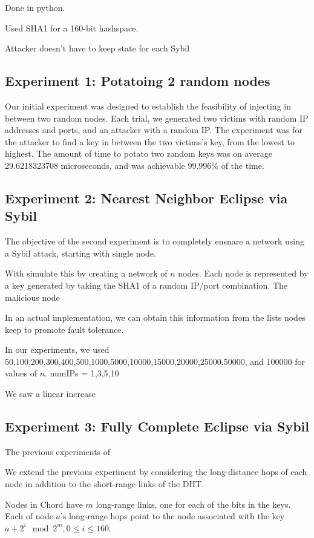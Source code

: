 \documentclass[10pt,a4paper]{article}
\begin{document}
Done in python.

Used SHA1 for a 160-bit hashspace.

Attacker doesn't have to keep state for each Sybil

\subsection{Experiment 1: Potatoing 2 random nodes}
Our initial experiment was designed to establish the feasibility of injecting in between two random nodes.
Each trial, we generated two victims with random IP addresses and ports, and an attacker with a random IP.
The experiment was for the attacker to find a key in between the two victims's key, from the lowest to highest.
The amount of time to potato two random keys was on average 29.6218323708 microseconds, and was achievable $ 99.996\%$ of the time.



\subsection{Experiment 2:  Nearest Neighbor Eclipse via Sybil}
The objective of the second experiment is to completely ensnare a network using a Sybil attack, starting with single node.

With simulate this by creating a network of $n$ nodes.  
Each node is represented by a key generated by taking the SHA1 of a random IP/port combination.
The malicious node 

In an actual implementation, we can obtain this information from the lists nodes keep to promote fault tolerance.


In our experiments, we used 50,100,200,300,400,500,1000,5000,10000,15000,20000,25000,50000, and 100000 for values of $n$.
numIPs = 1,3,5,10

We saw a linear increase


\subsection{Experiment 3: Fully Complete Eclipse via Sybil}
The previous experiments of


We extend the previous experiment by considering the long-distance hops of each node in addition to the short-range links of the DHT.

Nodes in Chord have $m$ long-range links, one for each of the bits in the keys.
Each of node $a$'s long-range hops point to the node associated with the key $a + 2^{i} \mod 2^{m} , 0 \leq i \leq 160$.
\end{document}
